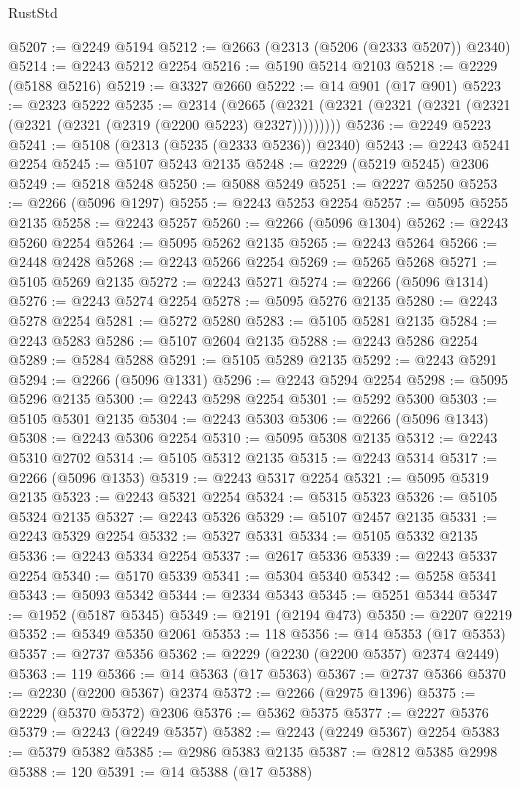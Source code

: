 \begin{lexlean}{RustStd}
\begin{coremodule}
@5207 := @2249 @5194
@5212 := @2663 (@2313 (@5206 (@2333 @5207)) @2340)
@5214 := @2243 @5212 @2254
@5216 := @5190 @5214 @2103
@5218 := @2229 (@5188 @5216)
@5219 := @3327 @2660
@5222 := @14 @901 (@17 @901)
@5223 := @2323 @5222
@5235 := @2314
    (@2665 (@2321 (@2321 (@2321 (@2321 (@2321 (@2321 (@2321 (@2319 (@2200 @5223) @2327)))))))))
@5236 := @2249 @5223
@5241 := @5108 (@2313 (@5235 (@2333 @5236)) @2340)
@5243 := @2243 @5241 @2254
@5245 := @5107 @5243 @2135
@5248 := @2229 (@5219 @5245) @2306
@5249 := @5218 @5248
@5250 := @5088 @5249
@5251 := @2227 @5250
@5253 := @2266 (@5096 @1297)
@5255 := @2243 @5253 @2254
@5257 := @5095 @5255 @2135
@5258 := @2243 @5257
@5260 := @2266 (@5096 @1304)
@5262 := @2243 @5260 @2254
@5264 := @5095 @5262 @2135
@5265 := @2243 @5264
@5266 := @2448 @2428
@5268 := @2243 @5266 @2254
@5269 := @5265 @5268
@5271 := @5105 @5269 @2135
@5272 := @2243 @5271
@5274 := @2266 (@5096 @1314)
@5276 := @2243 @5274 @2254
@5278 := @5095 @5276 @2135
@5280 := @2243 @5278 @2254
@5281 := @5272 @5280
@5283 := @5105 @5281 @2135
@5284 := @2243 @5283
@5286 := @5107 @2604 @2135
@5288 := @2243 @5286 @2254
@5289 := @5284 @5288
@5291 := @5105 @5289 @2135
@5292 := @2243 @5291
@5294 := @2266 (@5096 @1331)
@5296 := @2243 @5294 @2254
@5298 := @5095 @5296 @2135
@5300 := @2243 @5298 @2254
@5301 := @5292 @5300
@5303 := @5105 @5301 @2135
@5304 := @2243 @5303
@5306 := @2266 (@5096 @1343)
@5308 := @2243 @5306 @2254
@5310 := @5095 @5308 @2135
@5312 := @2243 @5310 @2702
@5314 := @5105 @5312 @2135
@5315 := @2243 @5314
@5317 := @2266 (@5096 @1353)
@5319 := @2243 @5317 @2254
@5321 := @5095 @5319 @2135
@5323 := @2243 @5321 @2254
@5324 := @5315 @5323
@5326 := @5105 @5324 @2135
@5327 := @2243 @5326
@5329 := @5107 @2457 @2135
@5331 := @2243 @5329 @2254
@5332 := @5327 @5331
@5334 := @5105 @5332 @2135
@5336 := @2243 @5334 @2254
@5337 := @2617 @5336
@5339 := @2243 @5337 @2254
@5340 := @5170 @5339
@5341 := @5304 @5340
@5342 := @5258 @5341
@5343 := @5093 @5342
@5344 := @2334 @5343
@5345 := @5251 @5344
@5347 := @1952 (@5187 @5345)
@5349 := @2191 (@2194 @473)
@5350 := @2207 @2219
@5352 := @5349 @5350 @2061
@5353 := 118
@5356 := @14 @5353 (@17 @5353)
@5357 := @2737 @5356
@5362 := @2229 (@2230 (@2200 @5357) @2374 @2449)
@5363 := 119
@5366 := @14 @5363 (@17 @5363)
@5367 := @2737 @5366
@5370 := @2230 (@2200 @5367) @2374
@5372 := @2266 (@2975 @1396)
@5375 := @2229 (@5370 @5372) @2306
@5376 := @5362 @5375
@5377 := @2227 @5376
@5379 := @2243 (@2249 @5357)
@5382 := @2243 (@2249 @5367) @2254
@5383 := @5379 @5382
@5385 := @2986 @5383 @2135
@5387 := @2812 @5385 @2998
@5388 := 120
@5391 := @14 @5388 (@17 @5388)

\end{coremodule}
\end{lexlean}
